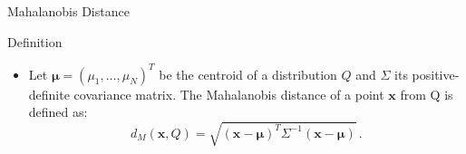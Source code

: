\begin{frame}{Mahalanobis Distance}
  \begin{minipage}{0.47\textwidth}
      \centering
      \begin{definitionblock}{Definition}
          \begin{itemize}
              \item Let $\mathbf{\mu} = {(\mu_1, \dots, \mu_N)}^T$ be the centroid of a distribution $Q$ and $\Sigma$ its positive-definite covariance matrix. The Mahalanobis distance of a point $\mathbf{x}$ from Q is defined as:
              \[
                  d_M(\mathbf{x}, Q) = \sqrt{{(\mathbf{x}-\mathbf{\mu})}^T\Sigma^{-1}(\mathbf{x}-\mathbf{\mu})}\,.
              \]
          \end{itemize}
      \end{definitionblock}
  \end{minipage}
  \quad
  \begin{minipage}{0.49\textwidth}
          \begin{figure}[h]
              \centering
\end{figure}
\end{minipage}
\end{frame}

